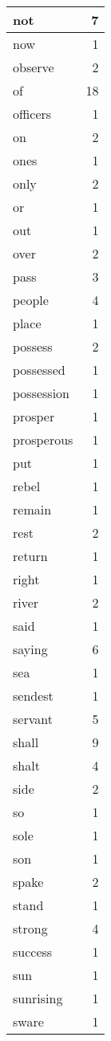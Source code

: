 \begin{center}
\begin{longtable}{l|r}
not & 7 \\ \hline
now & 1 \\ \hline
observe & 2 \\ \hline
of & 18 \\ \hline
officers & 1 \\ \hline
on & 2 \\ \hline
ones & 1 \\ \hline
only & 2 \\ \hline
or & 1 \\ \hline
out & 1 \\ \hline
over & 2 \\ \hline
pass & 3 \\ \hline
people & 4 \\ \hline
place & 1 \\ \hline
possess & 2 \\ \hline
possessed & 1 \\ \hline
possession & 1 \\ \hline
prosper & 1 \\ \hline
prosperous & 1 \\ \hline
put & 1 \\ \hline
rebel & 1 \\ \hline
remain & 1 \\ \hline
rest & 2 \\ \hline
return & 1 \\ \hline
right & 1 \\ \hline
river & 2 \\ \hline
said & 1 \\ \hline
saying & 6 \\ \hline
sea & 1 \\ \hline
sendest & 1 \\ \hline
servant & 5 \\ \hline
shall & 9 \\ \hline
shalt & 4 \\ \hline
side & 2 \\ \hline
so & 1 \\ \hline
sole & 1 \\ \hline
son & 1 \\ \hline
spake & 2 \\ \hline
stand & 1 \\ \hline
strong & 4 \\ \hline
success & 1 \\ \hline
sun & 1 \\ \hline
sunrising & 1 \\ \hline
sware & 1 \\ \hline

\end{longtable}
\end{center}
